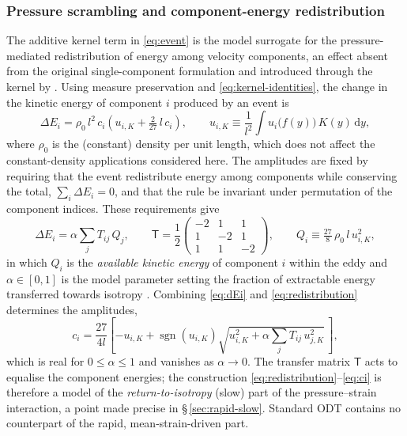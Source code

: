 \documentclass[lineno]{JFM-FLM_Au}
\begin{document}
\subsubsection{Pressure scrambling and component-energy redistribution}

The additive kernel term in \eqref{eq:event} is the model surrogate for the
pressure-mediated redistribution of energy among velocity components, an
effect absent from the original single-component formulation
\citep{Kerstein1999} and introduced through the kernel by
\citet{WunschKerstein2001,Kerstein2001}. Using measure preservation and
\eqref{eq:kernel-identities}, the change in the kinetic energy of component
$i$ produced by an event is
\begin{equation}
  \Delta E_i = \rho_0\, l^2\, c_i\!\left(u_{i,K}+\tfrac{2}{27}\,l\,c_i\right),
  \qquad
  u_{i,K}\equiv\frac{1}{l^2}\int u_i\!\big(f(y)\big)\,K(y)\,\mathrm{d}y,
  \label{eq:dEi}
\end{equation}
where $\rho_0$ is the (constant) density per unit length, which does not
affect the constant-density applications considered here. The amplitudes
are fixed by requiring that the event redistribute energy among components
while conserving the total, $\sum_i\Delta E_i=0$, and that the rule be
invariant under permutation of the component indices. These requirements
give
\begin{equation}
  \Delta E_i = \alpha\sum_j T_{ij}\,Q_j,
  \qquad
  \mathsf{T}=\frac{1}{2}
  \begin{pmatrix}
    -2 & 1 & 1\\ 1 & -2 & 1\\ 1 & 1 & -2
  \end{pmatrix},
  \qquad
  Q_i\equiv\tfrac{27}{8}\,\rho_0\, l\, u_{i,K}^2,
  \label{eq:redistribution}
\end{equation}
in which $Q_i$ is the \emph{available kinetic energy} of component $i$
within the eddy and $\alpha\in[0,1]$ is the model parameter setting the
fraction of extractable energy transferred towards isotropy
\citep{Kerstein2001}. Combining \eqref{eq:dEi} and
\eqref{eq:redistribution} determines the amplitudes,
\begin{equation}
  c_i = \frac{27}{4l}\left[-u_{i,K}
        +\operatorname{sgn}(u_{i,K})
        \sqrt{u_{i,K}^2+\alpha\sum_j T_{ij}\,u_{j,K}^2}\,\right],
  \label{eq:ci}
\end{equation}
which is real for $0\le\alpha\le1$ and vanishes as $\alpha\to0$. The
transfer matrix $\mathsf{T}$ acts to equalise the component energies; the
construction \eqref{eq:redistribution}--\eqref{eq:ci} is therefore a model
of the \emph{return-to-isotropy} (slow) part of the pressure--strain
interaction, a point made precise in \S\,\ref{sec:rapid-slow}. Standard ODT
contains no counterpart of the rapid, mean-strain-driven part.
\end{document}
